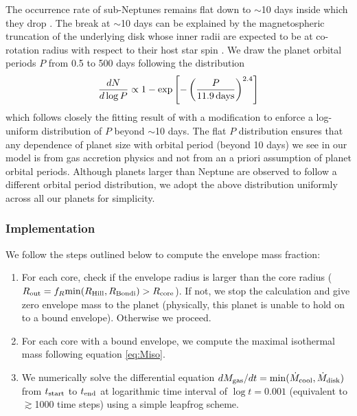\documentclass[twocolumn]{aastex631}
\begin{document}
The occurrence rate of sub-Neptunes remains flat down to $\sim$10 days inside which they drop \citep{Youdin11,fressin13,Petigura18}. The break at $\sim$10 days can be explained by the magnetospheric truncation of the underlying disk whose inner radii are expected to be at co-rotation radius with respect to their host star spin \citep{Mulders15,Lee17}. We draw the planet orbital periods $P$ from 0.5 to 500 days following the distribution
\begin{equation}
    \frac{dN}{d\log P} \propto 1-\exp\left[-\left(\frac{P}{11.9\,{\rm days}}\right)^{2.4}\right]
    \label{eq:dNdlogP}
\end{equation}
which follows closely the fitting result of \citet{Petigura18} with a modification to enforce a log-uniform distribution of $P$ beyond $\sim$10 days. The flat $P$ distribution ensures that any dependence of planet size with orbital period (beyond 10 days) we see in our model is from gas accretion physics and not from an a priori assumption of planet orbital periods. Although planets larger than Neptune are observed to follow a different orbital period distribution, we adopt the above distribution uniformly across all our planets for simplicity.

\subsubsection{Implementation}

We follow the steps outlined below to compute the envelope mass fraction:

\begin{enumerate}
    \item For each core, check if the envelope radius is larger than the core radius ($R_{\rm out} = f_R {\rm min}(R_{\rm Hill}, R_{\rm Bondi}) > R_{\rm core}$). If not, we stop the calculation and give zero envelope mass to the planet (physically, this planet is unable to hold on to a bound envelope). Otherwise we proceed.
    
    \item For each core with a bound envelope, we compute the maximal isothermal mass following equation \ref{eq:Miso}.
    
    \item We numerically solve the differential equation $dM_{\rm gas}/dt = {\rm min}(\dot{M}_{\rm cool}, \dot{M}_{\rm disk})$ from $t_{\rm start}$ to $t_{\rm end}$ at logarithmic time interval of $\log t = 0.001$ (equivalent to $\gtrsim$1000 time steps) using a simple leapfrog scheme.
\end{enumerate}
\end{document}
